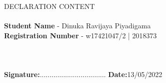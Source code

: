 DECLARATION CONTENT
\\
\\
\noindent\textbf{Student Name} - Dinuka Ravijaya Piyadigama \\
\textbf{Registration Number} - w17421047/2 | 2018373
\\
\\
\\
\\
\textbf{Signature:}..................................
\hfill 
\textbf{Date:}13/05/2022